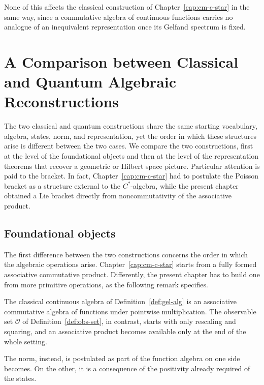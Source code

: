 	None of this affects the classical construction of Chapter~\ref{cap:cm-c-star} in the same way, since a commutative algebra of continuous functions carries no analogue of an inequivalent representation once its Gelfand spectrum is fixed.
	
	\section{A Comparison between Classical and Quantum Algebraic Reconstructions}
	\label{sec:concl-comparison}
	
	The two classical and quantum constructions share the same starting vocabulary, algebra, states, norm, and representation, yet the order in which these structures arise is different between the two cases. We compare the two constructions, first at the level of the foundational objects and then at the level of the representation theorems that recover a geometric or Hilbert space picture. Particular attention is paid to the bracket. In fact, Chapter~\ref{cap:cm-c-star} had to postulate the Poisson bracket as a structure external to the $C^*$-algebra, while the present chapter obtained a Lie bracket directly from noncommutativity of the associative product.
	
	\subsection*{Foundational objects}
	
	The first difference between the two constructions concerns the order in which the algebraic operations arise. Chapter~\ref{cap:cm-c-star} starts from a fully formed associative commutative product. Differently, the present chapter has to build one from more primitive operations, as the following remark specifies.
	
	\begin{remark}
		\label{rem:concl-product-comparison}
		The classical continuous algebra of Definition~\ref{def:gel-alg} is an associative commutative algebra of functions under pointwise multiplication. The observable set $\mathcal{O}$ of Definition~\ref{def:obs-set}, in contrast, starts with only rescaling and squaring, and an associative product becomes available only at the end of the whole setting.
	\end{remark}
	
	\noindent The norm, instead, is postulated as part of the function algebra on one side becomes. On the other, it is a consequence of the positivity already required of the states.
	

